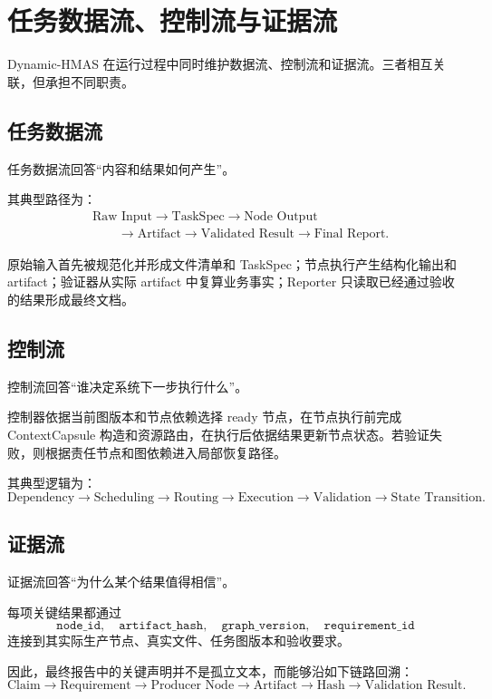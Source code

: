 \documentclass[UTF8,a4paper,12pt,oneside]{ctexbook}
\begin{document}
\section{任务数据流、控制流与证据流}

Dynamic-HMAS 在运行过程中同时维护数据流、控制流和证据流。三者相互关联，但承担不同职责。

\subsection{任务数据流}

任务数据流回答“内容和结果如何产生”。

其典型路径为：
\[
\begin{aligned}
&\text{Raw Input}
\rightarrow \text{TaskSpec}
\rightarrow \text{Node Output} \\[3pt]
&\qquad\rightarrow \text{Artifact}
\rightarrow \text{Validated Result}
\rightarrow \text{Final Report}.
\end{aligned}
\]

原始输入首先被规范化并形成文件清单和 TaskSpec；节点执行产生结构化输出和 artifact；验证器从实际 artifact 中复算业务事实；Reporter 只读取已经通过验收的结果形成最终文档。

\subsection{控制流}

控制流回答“谁决定系统下一步执行什么”。

控制器依据当前图版本和节点依赖选择 ready 节点，在节点执行前完成 ContextCapsule 构造和资源路由，在执行后依据结果更新节点状态。若验证失败，则根据责任节点和图依赖进入局部恢复路径。

其典型逻辑为：
\[
\text{Dependency}
\rightarrow
\text{Scheduling}
\rightarrow
\text{Routing}
\rightarrow
\text{Execution}
\rightarrow
\text{Validation}
\rightarrow
\text{State Transition}.
\]

\subsection{证据流}

证据流回答“为什么某个结果值得相信”。

每项关键结果都通过
\[
\texttt{node\_id},
\quad
\texttt{artifact\_hash},
\quad
\texttt{graph\_version},
\quad
\texttt{requirement\_id}
\]
连接到其实际生产节点、真实文件、任务图版本和验收要求。

因此，最终报告中的关键声明并不是孤立文本，而能够沿如下链路回溯：
\[
\text{Claim}
\rightarrow
\text{Requirement}
\rightarrow
\text{Producer Node}
\rightarrow
\text{Artifact}
\rightarrow
\text{Hash}
\rightarrow
\text{Validation Result}.
\]
\end{document}
